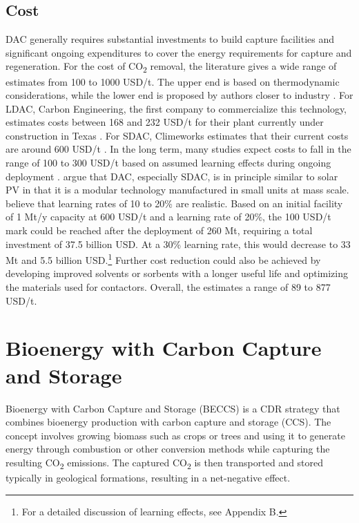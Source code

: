 \subsection*{Cost}
DAC generally requires substantial investments to build capture facilities and significant ongoing expenditures to cover the energy requirements for capture and regeneration.
For the cost of CO\textsubscript{2} removal, the literature gives a wide range of estimates from 100 to 1000 USD/t. The upper end is based on thermodynamic considerations, while the lower end is proposed by authors closer to industry \parencite{Ishimoto2017PuttingContext, NRC2015ClimateSequestration}.
For LDAC, Carbon Engineering, the first company to commercialize this technology, estimates costs between 168 and 232 USD/t for their plant currently under construction in Texas \parencite{McQueen2021AFuture}. For SDAC, Climeworks estimates that their current costs are around 600 USD/t \parencite[220]{NAS2018NegativeAgenda}.
In the long term, many studies expect costs to fall in the range of 100 to 300 USD/t based on assumed learning effects during ongoing deployment \parencite{Mulligan2020CarbonShot:States, McQueen2021AFuture, NAS2018NegativeAgenda}. \textcite{Lackner2021BuyingCapture} argue that DAC, especially SDAC, is in principle similar to solar PV in that it is a modular technology manufactured in small units at mass scale. \textcite{McQueen2021AFuture} believe that learning rates of 10 to 20\% are realistic. Based on an initial facility of 1 Mt/y capacity at 600 USD/t and a learning rate of 20\%, the 100 USD/t mark could be reached after the deployment of 260 Mt, requiring a total investment of 37.5 billion USD. At a 30\% learning rate, this would decrease to 33 Mt and 5.5 billion USD.\footnote{For a detailed discussion of learning effects, see Appendix B.}
Further cost reduction could also be achieved by developing improved solvents or sorbents with a longer useful life and optimizing the materials used for contactors.
Overall, the \textcite{NAS2018NegativeAgenda} estimates a range of 89 to 877 USD/t.

\section{Bioenergy with Carbon Capture and Storage}
Bioenergy with Carbon Capture and Storage (BECCS) is a CDR strategy that combines bioenergy production with carbon capture and storage (CCS). The concept involves growing biomass such as crops or trees and using it to generate energy through combustion or other conversion methods while capturing the resulting CO\textsubscript{2} emissions. The captured CO\textsubscript{2} is then transported and stored typically in geological formations, resulting in a net-negative effect.
